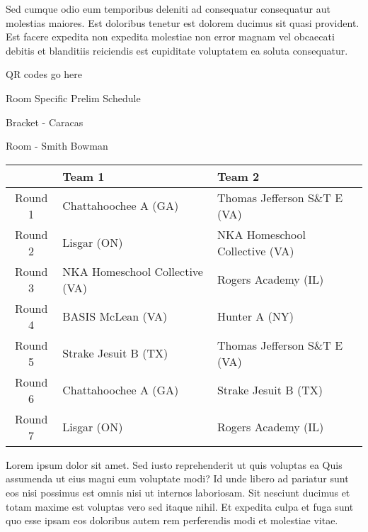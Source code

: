 \documentclass{article}%
\begin{document}
\newline%
Sed cumque odio eum temporibus deleniti ad consequatur consequatur aut molestias maiores. Est doloribus tenetur est dolorem ducimus sit quasi provident. Est facere expedita non expedita molestiae non error magnam vel obcaecati debitis et blanditiis reiciendis est cupiditate voluptatem ea soluta consequatur.%
\vspace*{140pt}%
\begin{center}%
\begin{Huge}%
QR codes go here%
\end{Huge}%
\end{center}%
\newpage%
\begin{center}%
\begin{Huge}%
Room Specific Prelim Schedule%
\end{Huge}%
\vspace*{8pt}%
\linebreak%
\begin{Large}%
Bracket {-} Caracas%
\end{Large}%
\vspace*{8pt}%
\linebreak%
\vspace*{8pt}%
\begin{Large}%
Room {-} Smith Bowman%
\end{Large}%
\end{center}%
%
\begin{tabularx}{\textwidth}{|c|Y|Y|}%
\hline%
&Team 1&Team 2\\%
\hline%
Round 1&Chattahoochee A (GA)&Thomas Jefferson S\&T E (VA)\\%
Round 2&Lisgar (ON)&NKA Homeschool Collective (VA)\\%
Round 3&NKA Homeschool Collective (VA)&Rogers Academy (IL)\\%
Round 4&BASIS McLean (VA)&Hunter A (NY)\\%
Round 5&Strake Jesuit B (TX)&Thomas Jefferson S\&T E (VA)\\%
Round 6&Chattahoochee A (GA)&Strake Jesuit B (TX)\\%
Round 7&Lisgar (ON)&Rogers Academy (IL)\\%
\hline%
\end{tabularx}%
\vspace*{8pt}%
\newline%
Lorem ipsum dolor sit amet. Sed iusto reprehenderit ut quis voluptas ea Quis assumenda ut eius magni eum voluptate modi? Id unde libero ad pariatur sunt eos nisi possimus est omnis nisi ut internos laboriosam. Sit nesciunt ducimus et totam maxime est voluptas vero sed itaque nihil. Et expedita culpa et fuga sunt quo esse ipsam eos doloribus autem rem perferendis modi et molestiae vitae.\newline%
\end{document}
